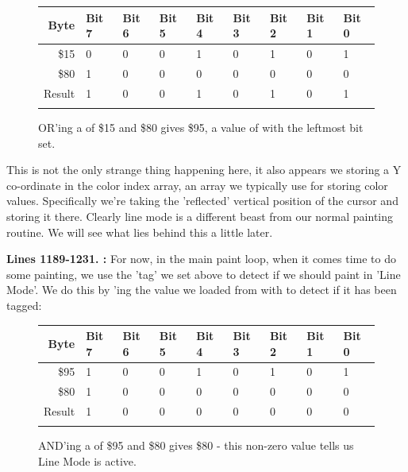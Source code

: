 \begin{figure}[H]
  {
    \setlength{\tabcolsep}{3.0pt}
    \setlength\cmidrulewidth{\heavyrulewidth} %
    \begin{adjustbox}{width=7cm,center}

      \begin{tabular}{rllllllll}
        \toprule
        Byte & Bit 7 & Bit 6 & Bit 5 & Bit 4 & Bit 3 & Bit 2 & Bit 1 & Bit 0        \\
        \midrule
        \$15 & 0 & 0 & 0 & 1 & 0 & 1 & 0 & 1 \\
        \$80 & 1 & 0 & 0 & 0 & 0 & 0 & 0 & 0 \\
        \midrule
      Result & 1 & 0 & 0 & 1 & 0 & 1 & 0 & 1 \\
        \addlinespace
        \bottomrule
      \end{tabular}

    \end{adjustbox}

  }\caption*{OR'ing a  of \$15 and \$80 gives \$95, a value of  with the leftmost bit set.}
\end{figure}

This is not the only strange thing happening here, it also 
appears we storing a Y co-ordinate in the color index array, an array we typically use for
storing color values. Specifically we're taking the 'reflected' vertical position of the 
cursor and storing it there. Clearly line mode is a different beast from our normal painting routine. We will
see what lies behind this a little later.


\textbf{Lines 1189-1231. :} For now, in the main paint loop, when it comes time to do some
painting, we use the 'tag' we set above to detect if we should paint in 'Line Mode'. We do this by 'ing the
value we loaded from  with  to detect if it has been tagged:

\begin{figure}[H]
  {
    \setlength{\tabcolsep}{3.0pt}
    \setlength\cmidrulewidth{\heavyrulewidth} %
    \begin{adjustbox}{width=7cm,center}

      \begin{tabular}{rllllllll}
        \toprule
        Byte & Bit 7 & Bit 6 & Bit 5 & Bit 4 & Bit 3 & Bit 2 & Bit 1 & Bit 0        \\
        \midrule
        \$95 & 1 & 0 & 0 & 1 & 0 & 1 & 0 & 1 \\
        \$80 & 1 & 0 & 0 & 0 & 0 & 0 & 0 & 0 \\
        \midrule
      Result & 1 & 0 & 0 & 0 & 0 & 0 & 0 & 0 \\
        \addlinespace
        \bottomrule
      \end{tabular}

    \end{adjustbox}

  }\caption*{AND'ing a  of \$95 and \$80 gives \$80 - this non-zero value tells us Line Mode is active.}
\end{figure}

